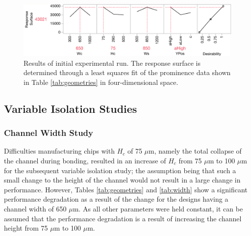 \begin{figure}[htb]
  \begin{minipage}[t]{0.99\linewidth}\centering
    \includegraphics[width=14cm]{L9}
  \end{minipage}\hfill
  \caption[Results of initial seeding of design space]{Results of initial experimental run. The response surface is determined through a least squares fit of the prominence data shown in Table \ref{tab:geometries} in four-dimensional space.}
	\label{fig:L9}
\end{figure}

\subsection{Variable Isolation Studies}
\label{ssec:iso}

\subsubsection{Channel Width Study}
\label{sssec:width}

Difficulties manufacturing chips with $H_c$ of 75 $\mu$m, namely the total collapse of the channel during bonding, resulted in an increase of $H_c$ from 75 $\mu$m to 100 $\mu$m for the subsequent variable isolation study; the assumption being that such a small change to the height of the channel would not result in a large change in performance. However, Tables \ref{tab:geometries} and \ref{tab:width} show a significant performance degradation as a result of the change for the designs having a channel width of 650 $\mu$m. As all other parameters were held constant, it can be assumed that the performance degradation is a result of increasing the channel height from 75 $\mu$m to 100 $\mu$m. 

